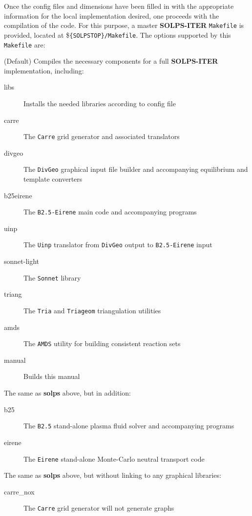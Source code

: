 \documentclass[a4paper,10pt]{report}
\newcommand\SOLPSITER{{\bf SOLPS-ITER} }
\begin{document}
Once the config files and dimensions have been filled in with the appropriate information for the
local implementation desired, one proceeds with the compilation of the code. For this
purpose, a master \SOLPSITER {\tt Makefile} is provided, located at \${\tt \{SOLPSTOP\}/Makefile}. The options supported by this {\tt Makefile} are:
\begin{description}
  \item[solps] (Default) Compiles the necessary components for a full \SOLPSITER implementation, including:
    \begin{description}
      \item[libs] Installs the needed libraries according to config file
      \item[carre] The {\tt Carre} grid generator and associated translators
      \item[divgeo] The {\tt DivGeo} graphical input file builder and accompanying equilibrium and template converters
      \item[b25eirene] The {\tt B2.5-Eirene} main code and accompanying programs
      \item[uinp] The {\tt Uinp} translator from {\tt DivGeo} output to {\tt B2.5-Eirene} input
      \item[sonnet-light] The {\tt Sonnet} library
      \item[triang] The {\tt Tria} and {\tt Triageom} triangulation utilities
      \item[amds] The {\tt AMDS} utility for building consistent reaction sets
      \item[manual] Builds this manual
    \end{description}
  \item[all] The same as {\bf solps} above, but in addition:
    \begin{description}
      \item[b25] The {\tt B2.5} stand-alone plasma fluid solver and accompanying programs
      \item[eirene] The {\tt Eirene} stand-alone Monte-Carlo neutral transport code
    \end{description}
  \item[nox] The same as {\bf solps} above, but without linking to any graphical libraries:
    \begin{description}
      \item[carre\_nox] The {\tt Carre} grid generator will not generate graphs

\end{description}
\end{description}
\end{document}
